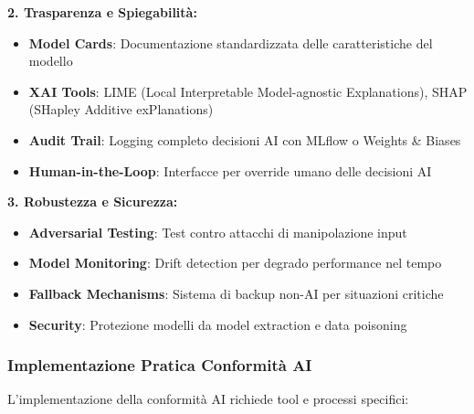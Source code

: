 \textbf{2. Trasparenza e Spiegabilità:}
\begin{itemize}
    \item \textbf{Model Cards}: Documentazione standardizzata delle caratteristiche del modello
    \item \textbf{XAI Tools}: LIME (Local Interpretable Model-agnostic Explanations), SHAP (SHapley Additive exPlanations)
    \item \textbf{Audit Trail}: Logging completo decisioni AI con MLflow o Weights \& Biases
    \item \textbf{Human-in-the-Loop}: Interfacce per override umano delle decisioni AI
\end{itemize}

\textbf{3. Robustezza e Sicurezza:}
\begin{itemize}
    \item \textbf{Adversarial Testing}: Test contro attacchi di manipolazione input
    \item \textbf{Model Monitoring}: Drift detection per degrado performance nel tempo
    \item \textbf{Fallback Mechanisms}: Sistema di backup non-AI per situazioni critiche
    \item \textbf{Security}: Protezione modelli da model extraction e data poisoning
\end{itemize}

\subsubsection{Implementazione Pratica Conformità AI}

L'implementazione della conformità AI richiede tool e processi specifici:

